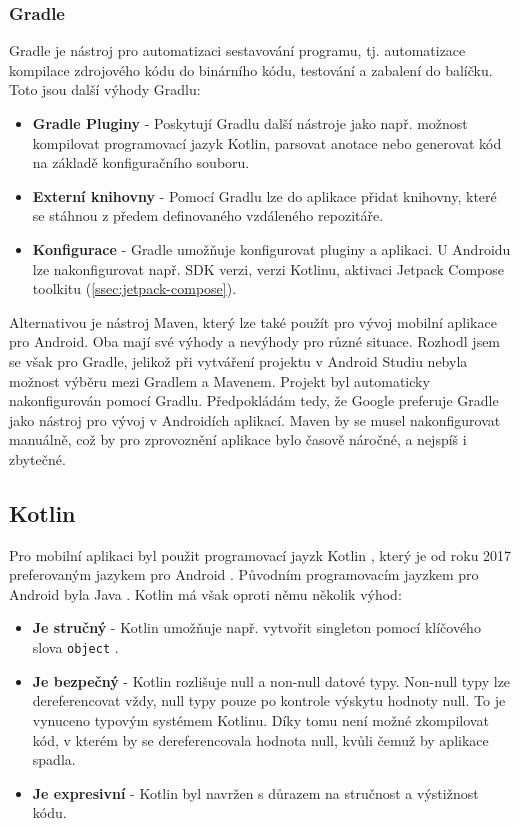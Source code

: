 \subsubsection *{Gradle}
Gradle je nástroj pro automatizaci sestavování programu, tj. automatizace kompilace zdrojového kódu do binárního kódu, testování a zabalení do balíčku. Toto jsou další výhody Gradlu: 

\begin{itemize}
	\item \textbf{Gradle Pluginy} - Poskytují Gradlu další nástroje jako např. možnost kompilovat programovací jazyk Kotlin, parsovat anotace nebo generovat kód na základě konfiguračního souboru. 
	
	\item \textbf{Externí knihovny} - Pomocí Gradlu lze do aplikace přidat knihovny, které se stáhnou z předem definovaného vzdáleného repozitáře.
	
	\item \textbf{Konfigurace} - Gradle umožňuje konfigurovat pluginy a aplikaci. U Androidu lze nakonfigurovat např. SDK verzi, verzi Kotlinu, aktivaci Jetpack Compose toolkitu (\ref{ssec:jetpack-compose}).
\end{itemize}

\noindent Alternativou je nástroj Maven, který lze také použít pro vývoj mobilní aplikace pro Android. Oba mají své výhody a nevýhody pro různé situace. Rozhodl jsem se však pro Gradle, jelikož při vytváření projektu v Android Studiu nebyla možnost výběru mezi Gradlem a Mavenem. Projekt byl automaticky nakonfigurován pomocí Gradlu. Předpokládám tedy, že Google preferuje Gradle jako nástroj pro vývoj v Androidích aplikací. Maven by se musel nakonfigurovat manuálně, což by pro zprovoznění aplikace bylo časově náročné, a nejspíš i zbytečné.

\subsection *{Kotlin}
Pro mobilní aplikaci byl použit programovací jayzk Kotlin \cite{kotlin}, který je od roku 2017 preferovaným jazykem pro Android \cite{google-prefers-kotlin}. Původním programovacím jayzkem pro Android byla Java \cite{java}. Kotlin má však oproti němu několik výhod:

\begin{itemize}
    \item \textbf{Je stručný} - Kotlin umožňuje např. vytvořit 
    singleton pomocí klíčového slova \lstinline{object} \cite{kotlin-object}.
    
    \item \textbf{Je bezpečný} - Kotlin rozlišuje null a non-null datové typy. Non-null typy lze dereferencovat vždy, null typy pouze po kontrole výskytu hodnoty null. To je vynuceno typovým systémem Kotlinu. Díky tomu není možné zkompilovat kód, v kterém by se dereferencovala hodnota null, kvůli čemuž by aplikace spadla.
    
    \item \textbf{Je expresivní} - Kotlin byl navržen s důrazem na stručnost a výstižnost kódu.
\end{itemize}


